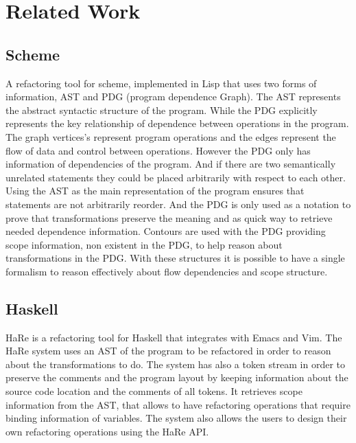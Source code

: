 \section{Related Work}
\label{sec:Related-Work}

\subsection{Scheme}
A refactoring tool \cite{griswold1991program} for scheme, implemented in Lisp that
uses two forms of information, AST and PDG (program dependence Graph).
The AST represents the abstract syntactic structure of the program.
While the PDG explicitly represents the key relationship of dependence between
operations in the program. %
The graph vertices's represent program operations and the edges represent the flow of
data and control between operations.
However the PDG only has information of dependencies of the program. And if there
are two semantically unrelated statements they could be placed arbitrarily with
respect to each other.
Using the AST as the main representation of the program ensures that statements
are not arbitrarily reorder.
And the PDG is only used as a notation to prove that transformations preserve
the meaning and as quick way to retrieve needed dependence information.
Contours are used with the PDG providing scope information, non existent in the PDG,
to help reason about transformations in the PDG.
With these structures it is possible to have a single formalism to reason effectively
about flow dependencies and scope structure.
\subsection{Haskell}
HaRe \cite{thompson2005refactoring} is a refactoring tool for Haskell that
integrates with Emacs and Vim.
The HaRe system uses an AST of the program to be
refactored in order to reason about the transformations to do.
The system has also a token stream in order to preserve the comments and the
program layout by keeping information about the source code location and the comments of all tokens.
It retrieves scope information from the AST, that allows to have refactoring operations that
require binding information of variables. %
The system also allows the users to design their own refactoring operations
using the HaRe API.
